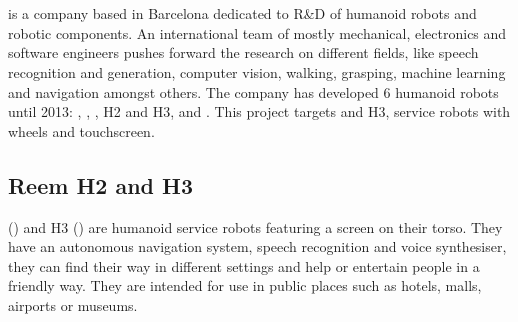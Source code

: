 \section{\company}
\company is a company based in Barcelona dedicated to R\&D of humanoid robots and robotic components. 
An international team of mostly mechanical, electronics and software engineers pushes forward the research on different fields, like speech recognition and generation, computer vision, walking, grasping, machine learning and navigation amongst others.
The company has developed 6 humanoid robots until 2013: , , , H2 and H3, and .
This project targets  and H3, service robots with wheels and touchscreen.

\subsection*{Reem H2 and H3}
 () and H3 () are humanoid service robots featuring a screen on their torso.
They have an autonomous navigation system, speech recognition and voice synthesiser, they can find their way in different settings and help or entertain people in a friendly way.
They are intended for use in public places such as hotels, malls, airports or museums.

